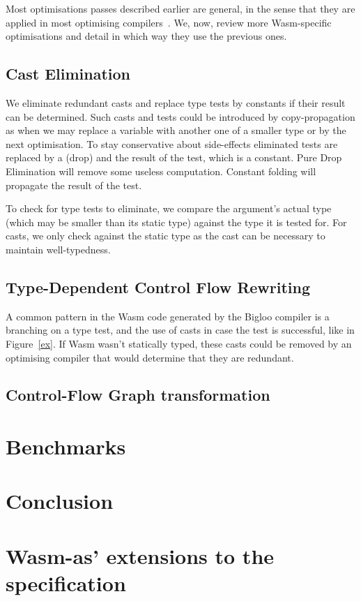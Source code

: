 \documentclass[a4paper,11pt]{article}
\begin{document}
Most optimisations passes described earlier are general, in the sense that they
are applied in most optimising compilers~\cite{muchnick1997advanced}. We, now,
review more Wasm-specific optimisations and detail in which way they use the
previous ones.
\subsection{Cast Elimination}
We eliminate redundant casts and replace type tests by constants if their result
can be determined. Such casts and tests could be introduced by copy-propagation
as when we may replace a variable with another one of a smaller type or by the
next optimisation. To stay conservative about side-effects eliminated tests are
replaced by a \textsf{(drop)} and the result of the test, which is a constant.
Pure Drop Elimination will remove some useless computation. Constant folding
will propagate the result of the test.

To check for type tests to eliminate, we compare the argument's actual type
(which may be smaller than its static type) against the type it is tested for.
For casts, we only check against the static type as the cast can be necessary to
maintain well-typedness.

\subsection{Type-Dependent Control Flow Rewriting}\label{broncast}
A common pattern in the Wasm code generated by the Bigloo compiler is a
branching on a type test, and the use of casts in case the test is successful,
like in Figure~\ref{ex}. If Wasm wasn't statically typed, these casts could be
removed by an optimising compiler that would determine that they are redundant.

\subsection{Control-Flow Graph transformation}
\section{Benchmarks}\label{bench}
\section{Conclusion}
\printbibliography
\newpage
\appendix
\section{Wasm-as' extensions to the specification}\label{wasmasex}
\end{document}
